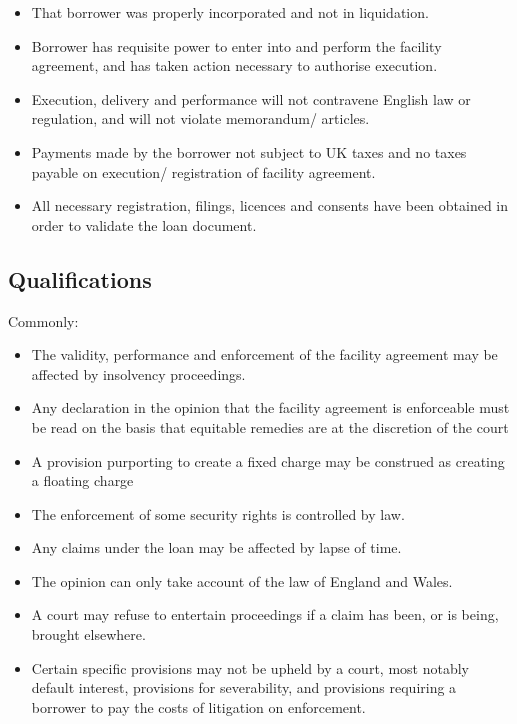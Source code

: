 \documentclass[
]{article}
\providecommand{\tightlist}{%
  \setlength{\itemsep}{0pt}\setlength{\parskip}{0pt}}
\begin{document}
\begin{itemize}
\tightlist
\item
  That borrower was properly incorporated and not in liquidation.
\item
  Borrower has requisite power to enter into and perform the facility
  agreement, and has taken action necessary to authorise execution.
\item
  Execution, delivery and performance will not contravene English law or
  regulation, and will not violate memorandum/ articles.
\item
  Payments made by the borrower not subject to UK taxes and no taxes
  payable on execution/ registration of facility agreement.
\item
  All necessary registration, filings, licences and consents have been
  obtained in order to validate the loan document.
\end{itemize}

\hypertarget{qualifications}{%
\subsection{Qualifications}\label{qualifications}}

Commonly:

\begin{itemize}
\tightlist
\item
  The validity, performance and enforcement of the facility agreement
  may be affected by insolvency proceedings.
\item
  Any declaration in the opinion that the facility agreement is
  enforceable must be read on the basis that equitable remedies are at
  the discretion of the court
\item
  A provision purporting to create a fixed charge may be construed as
  creating a floating charge
\item
  The enforcement of some security rights is controlled by law.
\item
  Any claims under the loan may be affected by lapse of time.
\item
  The opinion can only take account of the law of England and Wales.
\item
  A court may refuse to entertain proceedings if a claim has been, or is
  being, brought elsewhere.
\item
  Certain specific provisions may not be upheld by a court, most notably
  default interest, provisions for severability, and provisions
  requiring a borrower to pay the costs of litigation on enforcement.
\end{itemize}
\end{document}
